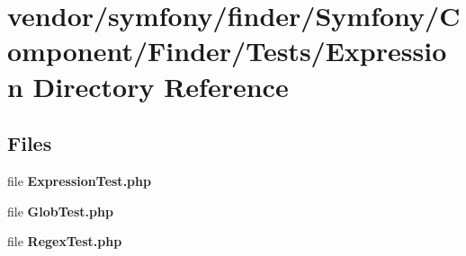 \section{vendor/symfony/finder/\+Symfony/\+Component/\+Finder/\+Tests/\+Expression Directory Reference}
\label{dir_bc7adf21045ad0fceb79a6c48d73dd39}
\subsection*{Files}
\begin{DoxyCompactItemize}
\item 
file {\bf Expression\+Test.\+php}
\item 
file {\bf Glob\+Test.\+php}
\item 
file {\bf Regex\+Test.\+php}
\end{DoxyCompactItemize}
